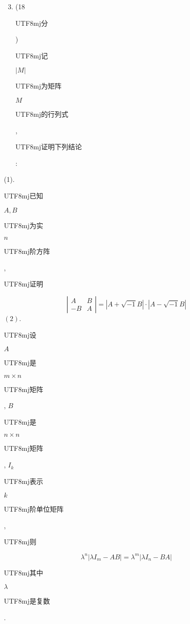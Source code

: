 \documentclass[10pt]{article}
\begin{document}
\begin{enumerate}
  \setcounter{enumi}{2}
  \item (18 \begin{CJK}{UTF8}{mj}分\end{CJK}) \begin{CJK}{UTF8}{mj}记\end{CJK} $|M|$ \begin{CJK}{UTF8}{mj}为矩阵\end{CJK} $M$ \begin{CJK}{UTF8}{mj}的行列式\end{CJK}, \begin{CJK}{UTF8}{mj}证明下列结论\end{CJK}:
\end{enumerate}
(1). \begin{CJK}{UTF8}{mj}已知\end{CJK} $A, B$ \begin{CJK}{UTF8}{mj}为实\end{CJK} $n$ \begin{CJK}{UTF8}{mj}阶方阵\end{CJK}, \begin{CJK}{UTF8}{mj}证明\end{CJK}
$$
\left|\begin{array}{cc}
A & B \\
-B & A
\end{array}\right|=|A+\sqrt{-1} B| \cdot|A-\sqrt{-1} B|
$$
$(2)$. \begin{CJK}{UTF8}{mj}设\end{CJK} $A$ \begin{CJK}{UTF8}{mj}是\end{CJK} $m \times n$ \begin{CJK}{UTF8}{mj}矩阵\end{CJK}, $B$ \begin{CJK}{UTF8}{mj}是\end{CJK} $n \times n$ \begin{CJK}{UTF8}{mj}矩阵\end{CJK}, $I_{k}$ \begin{CJK}{UTF8}{mj}表示\end{CJK} $k$ \begin{CJK}{UTF8}{mj}阶单位矩阵\end{CJK}, \begin{CJK}{UTF8}{mj}则\end{CJK}
$$
\lambda^{n}\left|\lambda I_{m}-A B\right|=\lambda^{m}\left|\lambda I_{n}-B A\right|
$$
\begin{CJK}{UTF8}{mj}其中\end{CJK} $\lambda$ \begin{CJK}{UTF8}{mj}是复数\end{CJK}.
\end{document}
